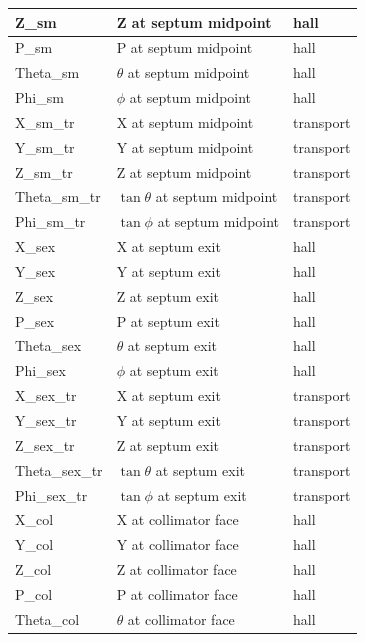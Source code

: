 \documentclass[11pt]{amsart}
\begin{document}
\begin{longtable}{| l | l | l |}
\hline
Z\_sm              & Z at septum midpoint  & hall \\
\hline
P\_sm              & P at septum midpoint  & hall \\
\hline
Theta\_sm          & $\theta$ at septum midpoint  & hall \\
\hline
Phi\_sm            & $\phi$ at septum midpoint  & hall \\
\hline
X\_sm\_tr           & X at septum midpoint  & transport\\
\hline
Y\_sm\_tr           & Y at septum midpoint  & transport\\
\hline
Z\_sm\_tr           & Z at septum midpoint  & transport\\
\hline
Theta\_sm\_tr       & $\tan{\theta}$ at septum midpoint  & transport\\
\hline
Phi\_sm\_tr         & $\tan{\phi}$ at septum midpoint  & transport\\
\hline
\hline
X\_sex              & X at septum exit  & hall \\
\hline
Y\_sex              & Y at septum exit  & hall \\
\hline
Z\_sex              & Z at septum exit  & hall \\
\hline
P\_sex              & P at septum exit  & hall \\
\hline
Theta\_sex          & $\theta$ at septum exit  & hall \\
\hline
Phi\_sex            & $\phi$ at septum exit  & hall \\
\hline
X\_sex\_tr           & X at septum exit  & transport\\
\hline
Y\_sex\_tr           & Y at septum exit  & transport\\
\hline
Z\_sex\_tr           & Z at septum exit  & transport\\
\hline
Theta\_sex\_tr       & $\tan{\theta}$ at septum exit  & transport\\
\hline
Phi\_sex\_tr         & $\tan{\phi}$ at septum exit  & transport\\
\hline
\hline
X\_col              & X at collimator face  & hall \\
\hline
Y\_col              & Y at collimator face  & hall \\
\hline
Z\_col              & Z at collimator face  & hall \\
\hline
P\_col              & P at collimator face  & hall \\
\hline
Theta\_col          & $\theta$ at collimator face  & hall \\

\end{longtable}
\end{document}
